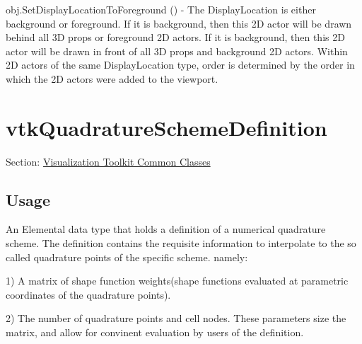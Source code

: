 \begin{DoxyItemize}
\item {\ttfamily obj.\-Set\-Display\-Location\-To\-Foreground ()} -\/ The Display\-Location is either background or foreground. If it is background, then this 2\-D actor will be drawn behind all 3\-D props or foreground 2\-D actors. If it is background, then this 2\-D actor will be drawn in front of all 3\-D props and background 2\-D actors. Within 2\-D actors of the same Display\-Location type, order is determined by the order in which the 2\-D actors were added to the viewport.  
\end{DoxyItemize}\hypertarget{vtkcommon_vtkquadratureschemedefinition}{}\section{vtk\-Quadrature\-Scheme\-Definition}\label{vtkcommon_vtkquadratureschemedefinition}
Section\-: \hyperlink{sec_vtkcommon}{Visualization Toolkit Common Classes} \hypertarget{vtkwidgets_vtkxyplotwidget_Usage}{}\subsection{Usage}\label{vtkwidgets_vtkxyplotwidget_Usage}
An Elemental data type that holds a definition of a numerical quadrature scheme. The definition contains the requisite information to interpolate to the so called quadrature points of the specific scheme. namely\-:


\begin{DoxyPre}
 1)
 A matrix of shape function weights(shape functions evaluated
 at parametric coordinates of the quadrature points).\end{DoxyPre}



\begin{DoxyPre} 2)
 The number of quadrature points and cell nodes. These parameters
 size the matrix, and allow for convinent evaluation by users
 of the definition.
 \end{DoxyPre}


